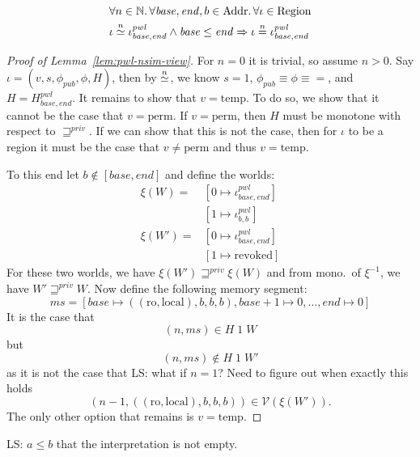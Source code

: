 \documentclass[a4paper]{article}
\newcommand{\nequal}[1][n]{\stackrel{\tiny{#1}}{=}}
\renewcommand{\nsim}[1][n]{\stackrel{\tiny{#1}}{\simeq}}
\newcommand\lau[1]{{\color{purple} \sf \footnotesize {LS: #1}}\\}
\newcommand{\var}[1]{\mathit{#1}}
\newcommand{\hs}{\var{ms}}
\newcommand{\ms}{\hs}
\newcommand{\start}{\var{base}}
\newcommand{\addrend}{\var{end}}
\newcommand{\pwl}{\var{pwl}}
\newcommand{\futurestr}{\mathbin{\sqsupseteq}^{\var{priv}}}
\newcommand{\asmType}{\plaindom{AsmType}}
\newcommand{\plaindom}[1]{\mathrm{#1}}
\newcommand{\Addrs}{\plaindom{Addr}}
\newcommand{\nats}{\mathbb{N}}
\newcommand{\Regions}{\plaindom{Region}}
\newcommand{\intr}[2]{\mathcal{#1}}
\newcommand{\valueintr}[1]{\intr{V}{#1}}
\newcommand{\stdvr}{\valueintr{\asmType}}
\newcommand{\npair}[2][n]{\left(#1,#2 \right)}
\newcommand{\plainperm}[1]{\mathrm{#1}}
\newcommand{\readonly}{\plainperm{ro}}
\newcommand{\local}{\plainperm{local}}
\newcommand{\plainview}[1]{\mathrm{#1}}
\newcommand{\perma}{\plainview{perm}}
\newcommand{\temp}{\plainview{temp}}
\newcommand{\revoked}{\plainview{revoked}}
\begin{document}
\begin{lemma}
  \label{lem:pwl-nsim-view}
  \begin{align*}
    & \forall n \in \nats \ldotp \forall \start, \addrend, b \in \Addrs \ldotp \forall \iota \in \Regions \\
    & \iota \nsim \iota^\pwl_{\start,\addrend} \land \start \leq \addrend \Rightarrow \iota \nequal \iota^\pwl_{\start,\addrend}
  \end{align*}
\end{lemma}
\begin{proof}[Proof of Lemma~\ref{lem:pwl-nsim-view}]
  For $n = 0$ it is trivial, so assume $n > 0$.
  Say $\iota = (v,s,\phi_{\var{pub}},\phi,H)$, then by $\nsim$, we know $s = 1$, $\phi_{\var{pub}} \equiv \phi \equiv =$, and $H = H^\pwl_{\start,\addrend}$. It remains to show that $v=\temp$. To do so, we show that it cannot be the case that $v=\perma$. If $v = \perma$, then $H$ must be monotone with respect to $\futurestr$. If we can show that this is not the case, then for $\iota$ to be a region it must be the case that $v \neq \perma$ and thus $v = \temp$.

  To this end let $b\not\in[\start,\addrend]$ and define the worlds:
  \begin{align*}
    \xi (W)  =& [0 \mapsto \iota^\pwl_{\start,\addrend}]  \\ 
              & [1 \mapsto \iota^\pwl_{b,b}] \\
    \xi (W')  =& [0 \mapsto \iota^\pwl_{\start,\addrend}]  \\ 
              & [1 \mapsto \revoked] 
  \end{align*}
  For these two worlds, we have $\xi(W') \futurestr \xi(W)$ and from mono.\ of $\xi^{-1}$, we have $W' \futurestr W$. Now define the following memory segment:
  \[
    \ms = [\start \mapsto ((\readonly,\local),b,b,b), \start+1 \mapsto 0, \dots , \addrend \mapsto 0]
  \]
  It is the case that
  \[
    \npair{\ms} \in H \; 1 \; W
  \]
  but
  \[
    \npair{\ms} \not\in H \; 1 \; W'
  \]
  as it is not the case that \lau{what if $n=1$? Need to figure out when exactly this holds}
  \[
    \npair[n-1]{((\readonly,\local),b,b,b)} \in \stdvr(\xi(W')).
  \]
  The only other option that remains is $v=\temp$.
\end{proof}
\lau{$a \leq b$ that the interpretation is not empty.}
\end{document}

